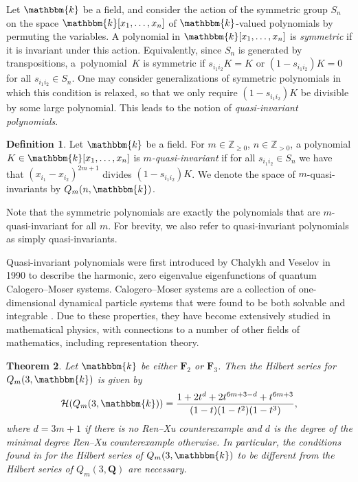 \documentclass[11pt]{article}
\numberwithin{equation}{section}
\newtheorem{Theorem}{Theorem}[section]
\theoremstyle{definition}
\newtheorem{Definition}[Theorem]{Definition}
\numberwithin{equation}{section}
\renewcommand{\k}{\mathbbm{k}}
\newcommand{\Z}{\mathbb{Z}}
\begin{document}
Let $\k$ be a field, and consider the action of the symmetric group $S_n$ on the space $\k[x_1,\dots,x_n]$ of $\k$-valued polynomials by permuting the variables. A polynomial in $\k[x_1,\dots,x_n]$ is \emph{symmetric} if it is invariant under this action. Equivalently, since $S_n$ is generated by transpositions, a~polynomial~$K$ is symmetric if $s_{i_1i_2}K=K$ or $(1-s_{i_1i_2})K=0$ for all $s_{i_1i_2}\in S_n$. One may consider generalizations of symmetric polynomials in which this condition is relaxed, so that we only require $(1-s_{i_1i_2})K$ be divisible by some large polynomial. This leads to the notion of \emph{quasi-invariant polynomials}.

\begin{Definition}
 Let $\k$ be a field. For $m\in\Z_{\geq 0}$, $n\in\Z_{>0}$, a polynomial $K\in\k[x_1,\dots,x_n]$ is \textit{$m$-quasi-invariant} if for all $s_{i_1i_2}\in S_n$ we have that $(x_{i_1}-x_{i_2})^{2m+1}$ divides $(1-s_{i_1i_2})K$. We denote the space of $m$-quasi-invariants by $Q_m(n,\k)$.
\end{Definition}

Note that the symmetric polynomials are exactly the polynomials that are $m$-quasi-invariant for all $m$. For brevity, we also refer to quasi-invariant polynomials as simply quasi-invariants.

Quasi-invariant polynomials were first introduced by Chalykh and Veselov in 1990 \cite{cmp/1104179957} to describe the harmonic, zero eigenvalue eigenfunctions of quantum Calogero--Moser systems. Calogero--Moser systems are a collection of one-dimensional dynamical particle systems that were found to be both solvable \cite{calogero} and integrable \cite{MOSER1975197}. Due to these properties, they have become extensively studied in mathematical physics, with connections to a number of other fields of mathematics, including representation theory.


\setcounter{Theorem}{2}
\begin{Theorem}\label{thm:1}
 Let $\k$ be either $\mathbf{F}_2$ or $\mathbf{F}_3$. Then the Hilbert series for $Q_m(3,\k)$ is given by
 \[\mathcal{H}(Q_m(3,\k))=\frac{1+2t^d+2t^{6m+3-d}+t^{6m+3}}{(1-t)(1-t^2)(1-t^3)},\]
 where $d=3m+1$ if there is no Ren--Xu counterexample and $d$ is the degree of the minimal degree Ren--Xu counterexample otherwise. In particular, the conditions found in {\rm \cite{Ren_2020}} for the Hilbert series of $Q_m(3,\k)$ to be different from the Hilbert series of $Q_m(3,\mathbf{Q})$ are necessary.
\end{Theorem}
\end{document}
